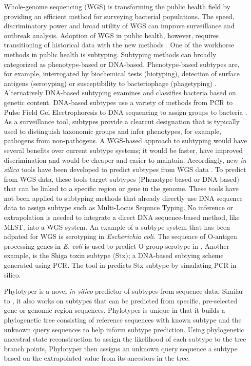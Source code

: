 \documentclass{bioinfo}
\begin{document}
Whole-genome sequencing (WGS) is transforming the public health field by providing an efficient method for surveying bacterial populations.
The speed, discriminatory power and broad utility of WGS can improve surveillance and outbreak analysis.
Adoption of WGS in public health, however, requires transitioning of historical data with the new methods \citep{Jenkins2015}.
One of the workhorse methods in public health is subtyping.
Subtyping methods can broadly categorized as phenotype-based or DNA-based.
Phenotype-based subtypes are, for example, interrogated by biochemical tests (biotyping), detection of surface antigens (serotyping) or susceptibility to bacteriophage (phagetyping) \citep{Wiedmann2002}.
Alternatively DNA-based subtyping examines and classifies bacteria based on genetic content.
DNA-based subtypes use a variety of methods from PCR to Pulse Field Gel Electrophoresis to DNA sequencing to assign groups to bacteria \citep{Wiedmann2002}.
As a surveillance tool, subtypes provide a clearcut designation that is typically used to distinguish taxonomic groups and infer phenotypes, for example, pathogens from non-pathogens.
A WGS-based approach to subtyping would have several benefits over current subtype systems; it would be faster, have improved discrimination and would be cheaper and easier to maintain\citep{Jenkins2015}.
Accordingly, new \textit{in silico} tools have been developed to predict subtypes from WGS data \citep{Joensen2015,Ingle2016,CARRILLO2016}.
To predict from WGS data, these tools target subtypes (Phenotype-based or DNA-based) that can be linked to a specific region or gene in the genome.
These tools have not been applied to subtyping methods that already directly use DNA sequence data to assign subtype such as Multi-Locus Sequnce Typing. 
No inference or extrapolation is needed to integrate a direct DNA sequence-based method, like MLST, into a WGS system.
An example of a subtype system that has been adpated for WGS is serotyping in \textit{Escherichia coli}.
The sequence of O-antigen processing genes in \textit{E. coli} is used to predict O group serotype in \citep{Joensen2015,Ingle2016}.
Another example, is the Shiga toxin subtype (Stx); a DNA-based subtying scheme generated using PCR.
The tool in \citep{CARRILLO2016} predicts Stx subtype by simulating PCR in silico.

Phylotyper is a novel \textit{in silico} predictor of subtypes from sequence data.
Similar to \citep{Joensen2015,Ingle2016,CARRILLO2016}, it also works on subtypes that can be predicted from specific, pre-selected gene or genomic region sequences.
Phylotyper is unique in that it builds a phylogenetic tree consisting of reference sequences with known subtype and the unknown query sequences to help inform subtype prediction.
Using phylogenetic ancestral state reconstruction to assign the likelihood of each subtype to the tree branch points, Phylotyper then assigns an unknown query sequence a subtype based on the extrapolated value from its ancestors in the tree.
\end{document}
